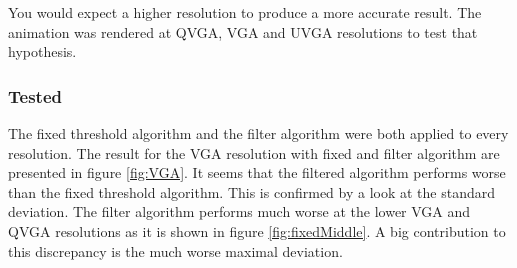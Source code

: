 You would expect a higher resolution to produce a more accurate result. The animation was rendered at QVGA, VGA and UVGA resolutions to test that hypothesis. 
\subsubsection{Tested}

The fixed threshold algorithm and the filter algorithm were both applied to every resolution. The result for the VGA resolution with fixed and filter algorithm are presented in figure \ref{fig:VGA}. It seems that the filtered algorithm performs worse than the fixed threshold algorithm. This is confirmed by a look at the standard deviation. The filter algorithm performs much worse at the lower VGA and QVGA resolutions as it is shown in figure \ref{fig:fixedMiddle}. A big contribution  to this discrepancy is the much worse maximal deviation. 

